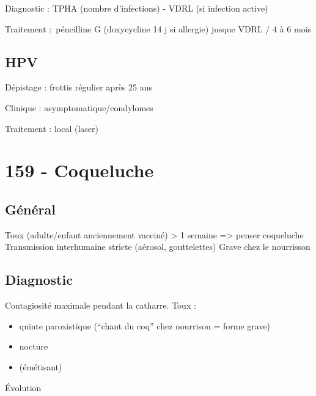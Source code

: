Diagnostic : TPHA (nombre d'infections) - VDRL (si infection active)

Traitement : péncilline G (doxycycline 14 j si allergie) jusque VDRL / 4 à 6 mois

\subsection{HPV}%
\danger Dépistage \female : frottis régulier après 25 ans

Clinique : asymptomatique/condylomes

Traitement : local (laser)


\label{sub:hpv}




\section{159 - Coqueluche}

\subsection{Général}

Toux (adulte/enfant anciennement vacciné) \textgreater{} 1 semaine
=\textgreater{} penser coqueluche Transmission interhumaine stricte
(aérosol, gouttelettes) Grave chez le nourrisson

\subsection{Diagnostic}

Contagiosité maximale pendant la catharre. Toux :

\begin{itemize}
\tightlist
\item
  quinte paroxistique (``chant du coq'' chez nourrison = forme grave)
\item
  nocture
\item
  (émétisant)
\end{itemize}

Évolution

